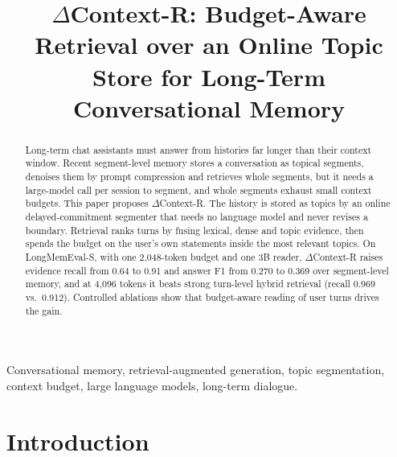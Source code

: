 \documentclass[conference]{IEEEtran}
\newcommand{\dcr}{$\Delta$Context-R}
\begin{document}
\title{\dcr{}: Budget-Aware Retrieval over an Online Topic Store for Long-Term Conversational Memory}

\author{
\and
{}
}

\maketitle

\begin{abstract}
Long-term chat assistants must answer from histories far longer than their
context window. Recent segment-level memory stores a conversation as topical
segments, denoises them by prompt compression and retrieves whole segments, but
it needs a large-model call per session to segment, and whole segments exhaust
small context budgets. This paper proposes \dcr{}. The history is stored as
topics by an online delayed-commitment segmenter that needs no language model
and never revises a boundary. Retrieval ranks turns by fusing lexical, dense
and topic evidence, then spends the budget on the user's own statements inside
the most relevant topics. On LongMemEval-S, with one 2,048-token budget and one
3B reader, \dcr{} raises evidence recall from 0.64 to 0.91 and answer F1 from
0.270 to 0.369 over segment-level memory, and at 4,096 tokens it beats strong
turn-level hybrid retrieval (recall 0.969 vs.\ 0.912). Controlled ablations show
that budget-aware reading of user turns drives the gain.
\end{abstract}

\begin{IEEEkeywords}
Conversational memory, retrieval-augmented generation, topic segmentation,
context budget, large language models, long-term dialogue.
\end{IEEEkeywords}

\section{Introduction}
\end{document}
